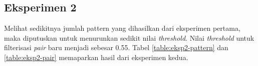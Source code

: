 
\subsection{Eksperimen 2}
Melihat sedikitnya jumlah pattern yang dihasilkan dari eksperimen pertama, maka diputuskan untuk menurunkan sedikit nilai \textit{threshold}. Nilai \textit{threshold} untuk filterisasi \textit{pair} baru menjadi sebesar 0.55. Tabel \ref{table:eksp2-pattern} dan \ref{table:eksp2-pair} memaparkan hasil dari eksperimen kedua.

